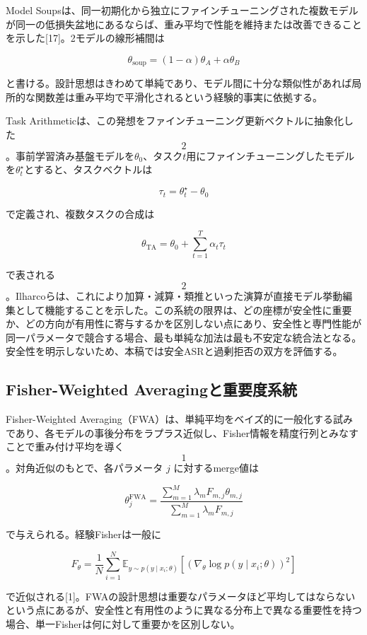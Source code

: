 \documentclass{article}
\begin{document}
Model Soupsは、同一初期化から独立にファインチューニングされた複数モデルが同一の低損失盆地にあるならば、重み平均で性能を維持または改善できることを示した[17]。2モデルの線形補間は

\[
\theta_{\mathrm{soup}}=(1-\alpha)\theta_A+\alpha\theta_B
\tag{1}
\]

と書ける。設計思想はきわめて単純であり、モデル間に十分な類似性があれば局所的な関数差は重み平均で平滑化されるという経験的事実に依拠する。

Task Arithmeticは、この発想をファインチューニング更新ベクトルに抽象化した\[2\]。事前学習済み基盤モデルを\(\theta_0\)、タスク\(t\)用にファインチューニングしたモデルを\(\theta_t^\star\)とすると、タスクベクトルは

\[
\tau_t=\theta_t^\star-\theta_0
\tag{2}
\]

で定義され、複数タスクの合成は

\[
\theta_{\mathrm{TA}}=\theta_0+\sum_{t=1}^{T}\alpha_t\tau_t
\tag{3}
\]

で表される\[2\]。Ilharcoらは、これにより加算・減算・類推といった演算が直接モデル挙動編集として機能することを示した。この系統の限界は、どの座標が安全性に重要か、どの方向が有用性に寄与するかを区別しない点にあり、安全性と専門性能が同一パラメータで競合する場合、最も単純な加法は最も不安定な統合法となる。安全性を明示しないため、本稿では安全ASRと過剰拒否の双方を評価する。

\subsection{Fisher-Weighted Averagingと重要度系統}

Fisher-Weighted Averaging（FWA）は、単純平均をベイズ的に一般化する試みであり、各モデルの事後分布をラプラス近似し、Fisher情報を精度行列とみなすことで重み付け平均を導く\[1\]。対角近似のもとで、各パラメータ \(j\) に対するmerge値は

\[
\theta_j^{\mathrm{FWA}}=\frac{\sum_{m=1}^{M}\lambda_m F_{m,j}\theta_{m,j}}{\sum_{m=1}^{M}\lambda_m F_{m,j}}
\tag{4}
\]

で与えられる。経験Fisherは一般に

\[
\hat F_{\theta}=\frac{1}{N}\sum_{i=1}^{N}\mathbb{E}_{y\sim p(y\mid x_i;\theta)}\left[(\nabla_{\theta}\log p(y\mid x_i;\theta))^2\right]
\tag{5}
\]

で近似される[1]。FWAの設計思想は重要なパラメータほど平均してはならないという点にあるが、安全性と有用性のように異なる分布上で異なる重要性を持つ場合、単一Fisherは何に対して重要かを区別しない。
\end{document}
